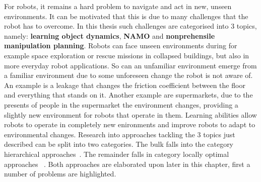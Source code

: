 For robots, it remains a hard problem to navigate and act in new, unseen environments. It can be motivated that this is due to many challenges that the robot has to overcome. In this thesis such challenges are categorised into 3 topics, namely: \textbf{learning object dynamics}, \textbf{\ac{NAMO}} and \textbf{nonprehensile manipulation planning}.
Robots can face unseen environments during for example space exploration or rescue missions in collapsed buildings, but also in more everyday robot applications. So can an unfamiliar environment emerge from a familiar environment due to some unforeseen change the robot is not aware of. An example is a leakage that changes the friction coefficient between the floor and everything that stands on it. Another example are supermarkets, due to the presents of people in the supermarket the environment changes, providing a slightly new environment for robots that operate in them. Learning abilities allow robots to operate in completely new enironments and improve robots to adapt to environmental changes. Research into approaches tackling the 3 topics just described can be split into two categories. The bulk falls into the category hierarchical approaches~\cite{kaelbling_hierarchical_2011,scholz_navigation_2016,krontiris_dealing_2015}. The remainder falls in category locally optimal approaches ~\cite{vega-brown_asymptotically_2020,sabbaghnovin_optimal_2016,novin_dynamic_2018,sabbaghnovin_model_2021}. Both approaches are elaborated upon later in this chapter, first a number of problems are highlighted.\bs

